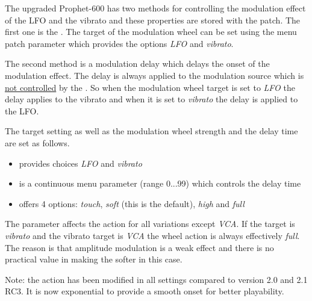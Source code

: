 The upgraded Prophet-600 has two methods for controlling the modulation effect of the LFO and the vibrato and these properties are  stored with the patch. The first one is the \modwheel. The target of the modulation wheel can be set using the menu patch parameter \modwheeltarget which provides the options \textit{LFO} and \textit{vibrato}. 

The second method is a modulation delay which delays the onset of the modulation effect. The delay is always applied to the modulation source which is \underline{not controlled} by the \modwheel. So when the modulation wheel target is set to \textit{LFO} the delay applies to the vibrato and when it is set to \textit{vibrato} the delay is applied to the LFO.

The target setting as well as the modulation wheel strength and the delay time are set as follows. 
\begin{itemize}
  \item \modwheeltarget provides choices \textit{LFO} and \textit{vibrato}
  \item \moddelay is a continuous menu parameter (range 0...99) which controls the delay time
  \item \modwheelrange offers 4 options: \textit{touch}, \textit{soft} (this is the default), \textit{high} and \textit{full}
\end{itemize} 

The parameter \modwheelrange affects the \modwheel action for all variations except \textit{VCA}. If the target is \textit{vibrato} and the vibrato target is \textit{VCA} the wheel action is always effectively \textit{full}. The reason is that amplitude modulation is a weak effect and there is no practical value in making the \modwheel softer in this case.

Note: the \modwheel action has been modified in all settings compared to version 2.0 and 2.1 RC3. It is now exponential to provide a smooth onset for better playability.
